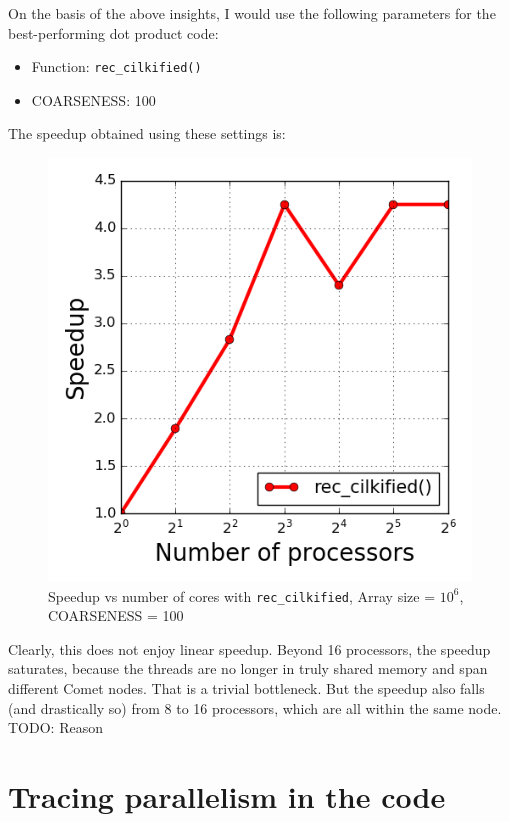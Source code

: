 \documentclass[12pt,letterpaper]{article}
\begin{document}
\noindent On the basis of the above insights, I would use the following parameters for the best-performing dot product code:
%
\begin{itemize}
\item Function: \texttt{rec\_cilkified()}
\item COARSENESS: 100
\end{itemize}
%
\noindent The speedup obtained using these settings is:
%
\begin{figure}[h]
\centering
\includegraphics[scale=0.5]{best_dot_prod.png}
\caption{Speedup vs number of cores with \texttt{rec\_cilkified}, Array size = $10^6$, COARSENESS = 100}
\end{figure}
%
\noindent Clearly, this does not enjoy linear speedup. Beyond 16 processors, the speedup saturates, because the threads are no longer in truly shared memory and span different Comet nodes. That is a trivial bottleneck. But the speedup also falls (and drastically so) from 8 to 16 processors, which are all within the same node. TODO: Reason

\section*{Tracing parallelism in the code}
\end{document}
